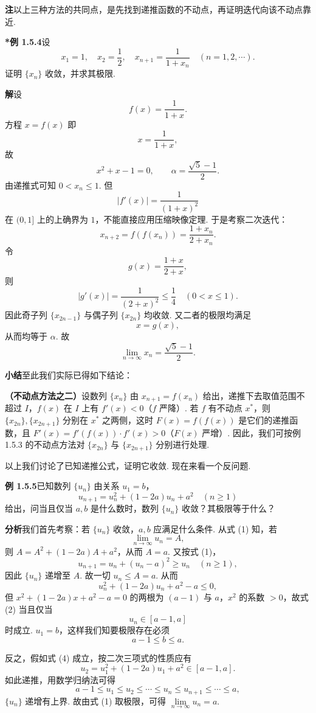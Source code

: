 \documentclass[UTF8, 12pt, fontset=fandol, oneside]{ctexart}
\begin{document}
\noindent\textbf{注}\quad 以上三种方法的共同点，是先找到递推函数的不动点，再证明迭代向该不动点靠近.

\noindent\textbf{*例 1.5.4}\quad 设
\[
  x_1=1,\quad x_2=\frac12,\quad
  x_{n+1}=\frac{1}{1+x_n}\quad (n=1,2,\cdots).
\]
证明 $\{x_n\}$ 收敛，并求其极限.

\noindent\textbf{解}\quad 设
\[
  f(x)=\frac{1}{1+x}.
\]
方程 $x=f(x)$ 即
\[
  x=\frac1{1+x},
\]
故
\[
  x^2+x-1=0,\qquad
  \alpha=\frac{\sqrt5-1}{2}.
\]
由递推式可知 $0<x_n\le 1$. 但
\[
  |f'(x)|=\frac{1}{(1+x)^2}
\]
在 $(0,1]$ 上的上确界为 $1$，不能直接应用压缩映像定理. 于是考察二次迭代：
\[
  x_{n+2}=f(f(x_n))=\frac{1+x_n}{2+x_n}.
\]
令
\[
  g(x)=\frac{1+x}{2+x},
\]
则
\[
  |g'(x)|=\frac{1}{(2+x)^2}\le \frac14\quad (0<x\le 1).
\]
因此奇子列 $\{x_{2n-1}\}$ 与偶子列 $\{x_{2n}\}$ 均收敛. 又二者的极限均满足
\[
  x=g(x),
\]
从而均等于 $\alpha$. 故
\[
  \lim_{n\to\infty}x_n=\frac{\sqrt5-1}{2}.
\]

\noindent\textbf{小结}\quad 至此我们实际已得如下结论：

\noindent\textbf{（不动点方法之二）}\quad 设数列 $\{x_n\}$ 由 $x_{n+1}=f(x_n)$ 给出，递推下去取值范围不超过 $I$，$f(x)$ 在 $I$ 上有 $f'(x)<0$（$f$ 严降）. 若 $f$ 有不动点 $x^*$，则 $\{x_{2n}\},\{x_{2n+1}\}$ 分别在 $x^*$ 之两侧，这时 $F(x)=f(f(x))$ 是它们的递推函数，且 $F'(x)=f'(f(x))\cdot f'(x)>0$（$F(x)$ 严增）. 因此，我们可按例 1.5.3 的不动点方法对 $\{x_{2n}\}$ 与 $\{x_{2n+1}\}$ 分别进行处理.

以上我们讨论了已知递推公式，证明它收敛. 现在来看一个反问题.

\noindent\textbf{例 1.5.5}\quad 已知数列 $\{u_n\}$ 由关系 $u_1=b$，
\[
  u_{n+1}=u_n^2+(1-2a)u_n+a^2\quad (n\ge 1)
\tag{1}
\]
给出，问当且仅当 $a,b$ 是什么数时，数列 $\{u_n\}$ 收敛？其极限等于什么？

\noindent\textbf{分析}\quad 我们首先考察：若 $\{u_n\}$ 收敛，$a,b$ 应满足什么条件. 从式 (1) 知，若
\[
  \lim_{n\to\infty}u_n=A,
\]
则 $A=A^2+(1-2a)A+a^2$，从而 $A=a$. 又按式 (1)，
\[
  u_{n+1}=u_n+(u_n-a)^2\ge u_n\quad (n\ge 1),
\]
因此 $\{u_n\}$ 递增至 $A$. 故一切 $u_n\le A=a$. 从而
\[
  u_n^2+(1-2a)u_n+a^2-a\le 0,
\tag{2}
\]
但 $x^2+(1-2a)x+a^2-a=0$ 的两根为 $(a-1)$ 与 $a$，$x^2$ 的系数 $>0$，故式 (2) 当且仅当
\[
  u_n\in [a-1,a]
\tag{3}
\]
时成立. $u_1=b$，这样我们知要极限存在必须
\[
  a-1\le b\le a.
\tag{4}
\]

反之，假如式 (4) 成立，按二次三项式的性质应有
\[
  u_2=u_1^2+(1-2a)u_1+a^2\in [a-1,a].
\]
如此递推，用数学归纳法可得
\[
  a-1\le u_1\le u_2\le \cdots \le u_n\le u_{n+1}\le \cdots \le a,
\]
$\{u_n\}$ 递增有上界. 故由式 (1) 取极限，可得 $\lim\limits_{n\to\infty}u_n=a$.
\end{document}
